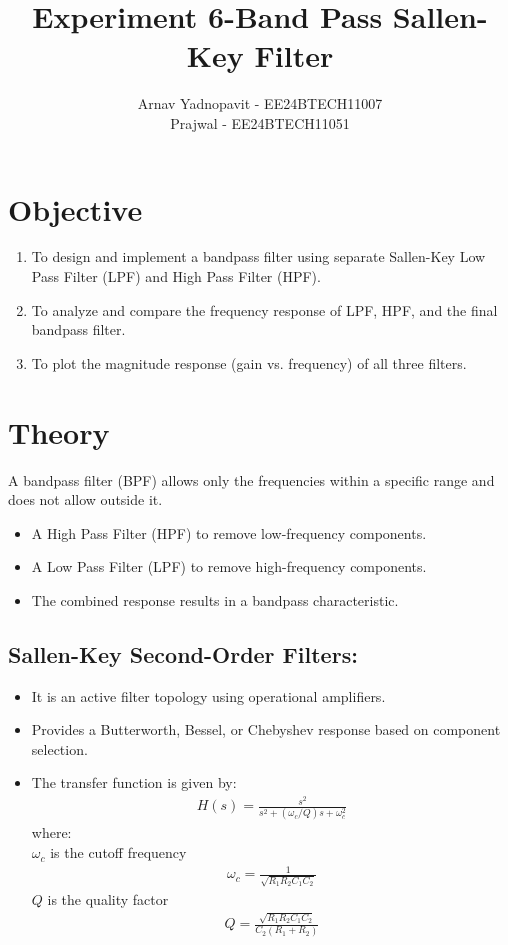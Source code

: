 \documentclass{article}
\title{Experiment 6-Band Pass Sallen-Key Filter}
\author{Arnav Yadnopavit - EE24BTECH11007 \\ Prajwal - EE24BTECH11051}
\begin{document}
\maketitle

\section{Objective}
\begin{enumerate}
    \item To design and implement a bandpass filter using separate Sallen-Key Low Pass Filter (LPF) and High Pass Filter (HPF).
    \item To analyze and compare the frequency response of LPF, HPF, and the final bandpass filter.
    \item To plot the magnitude response (gain vs. frequency) of all three filters.
\end{enumerate}

\section{Theory}
A bandpass filter (BPF) allows only the frequencies within a specific range and does not allow outside it.
\begin{itemize}
    \item A High Pass Filter (HPF) to remove low-frequency components.
    \item A Low Pass Filter (LPF) to remove high-frequency components.
    \item The combined response results in a bandpass characteristic.
\end{itemize}

\subsection{Sallen-Key Second-Order Filters:}
\begin{itemize}
    \item It is an active filter topology using operational amplifiers.
    \item Provides a Butterworth, Bessel, or Chebyshev response based on component selection.
    \item The transfer function is given by:
    \begin{align}
        H(s)=\frac{s^2}{s^2+(\omega_c/Q)s+\omega_c^2}
    \end{align}
    where:\\
    $\omega_c$ is the cutoff frequency
    \begin{align}
        \omega_c=\frac{1}{\sqrt{R_1R_2C_1C_2}}
    \end{align}
    $Q$ is the quality factor
    \begin{align}
        Q=\frac{\sqrt{R_1R_2C_1C_2}}{C_2(R_1+R_2)}
    \end{align}
\end{itemize}
\end{document}
